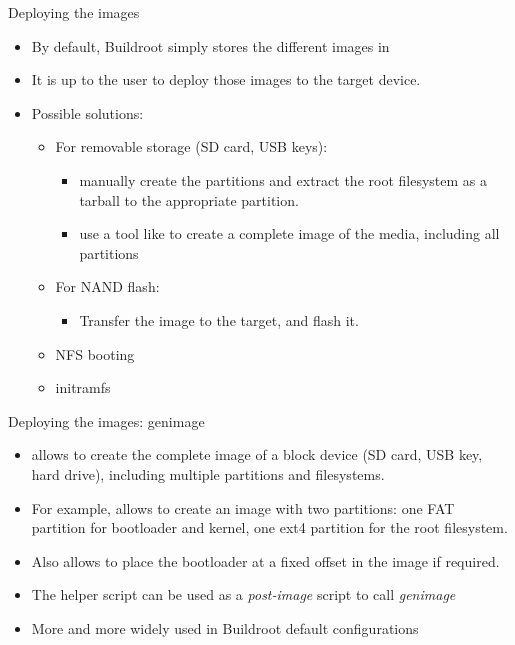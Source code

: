 \begin{frame}{Deploying the images}
  \begin{itemize}
  \item By default, Buildroot simply stores the different images in
  \item It is up to the user to deploy those images to the target
    device.
  \item Possible solutions:
    \begin{itemize}
    \item For removable storage (SD card, USB keys):
      \begin{itemize}
      \item manually create the partitions and extract the root
        filesystem as a tarball to the appropriate partition.
      \item use a tool like  to create a complete image
        of the media, including all partitions
      \end{itemize}
    \item For NAND flash:
      \begin{itemize}
      \item Transfer the image to the target, and flash it.
      \end{itemize}
    \item NFS booting
    \item initramfs
    \end{itemize}
  \end{itemize}
\end{frame}

\begin{frame}{Deploying the images: genimage}
  \begin{itemize}
  \item {} allows to create the complete image of a block
    device (SD card, USB key, hard drive), including multiple
    partitions and filesystems.
  \item For example, allows to create an image with two partitions: one
    FAT partition for bootloader and kernel, one ext4 partition for
    the root filesystem.
  \item Also allows to place the bootloader at a fixed offset in the
    image if required.
  \item The helper script  can be
    used as a {\em post-image} script to call {\em genimage}
  \item More and more widely used in Buildroot default configurations
  \end{itemize}
\end{frame}

